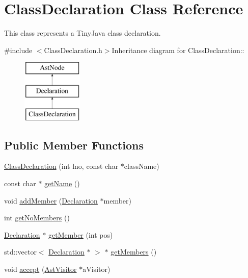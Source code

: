 \hypertarget{classClassDeclaration}{
\section{ClassDeclaration Class Reference}
\label{classClassDeclaration}
}


This class represents a TinyJava class declaration.  


{\ttfamily \#include $<$ClassDeclaration.h$>$}Inheritance diagram for ClassDeclaration::\begin{figure}[H]
\begin{center}
\leavevmode
\includegraphics[height=3cm]{classClassDeclaration}
\end{center}
\end{figure}
\subsection*{Public Member Functions}
\begin{DoxyCompactItemize}
\item 
\hyperlink{classClassDeclaration_a1016b2f9166666f12ff69d8f35c5f4b0}{ClassDeclaration} (int lno, const char $\ast$className)
\item 
const char $\ast$ \hyperlink{classClassDeclaration_aee9941ff0bc3f063352dc9150c8f4733}{getName} ()
\item 
void \hyperlink{classClassDeclaration_a4d48dcc425315c542f1bee48287fb237}{addMember} (\hyperlink{classDeclaration}{Declaration} $\ast$member)
\item 
int \hyperlink{classClassDeclaration_ae2b6695aa4eee03d8516637535ec4907}{getNoMembers} ()
\item 
\hyperlink{classDeclaration}{Declaration} $\ast$ \hyperlink{classClassDeclaration_a2a905ef9d8d1034606f554917c1a83f6}{getMember} (int pos)
\item 
std::vector$<$ \hyperlink{classDeclaration}{Declaration} $\ast$ $>$ $\ast$ \hyperlink{classClassDeclaration_ac52a79fdbdf26dd21327c54632d9d452}{getMembers} ()
\item 
void \hyperlink{classClassDeclaration_abb1e806c4c54cfecbc685b5c8a072eae}{accept} (\hyperlink{classAstVisitor}{AstVisitor} $\ast$aVisitor)
\end{DoxyCompactItemize}



